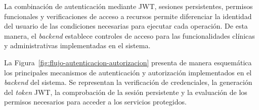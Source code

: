 La combinación de autenticación mediante JWT, sesiones
persistentes, permisos funcionales y verificaciones
de acceso a recursos permite diferenciar la identidad
del usuario de las condiciones necesarias para ejecutar
cada operación. De esta manera, el \textit{backend} establece
controles de acceso para las funcionalidades clínicas
y administrativas implementadas en el sistema.


La Figura~\ref{fig:flujo-autenticacion-autorizacion}
presenta de manera esquemática los principales
mecanismos de autenticación y autorización
implementados en el \textit{backend} del sistema.
Se representan la verificación de credenciales,
la generación del \textit{token} JWT, la comprobación
de la sesión persistente y la evaluación de
los permisos necesarios para acceder a los
servicios protegidos.




